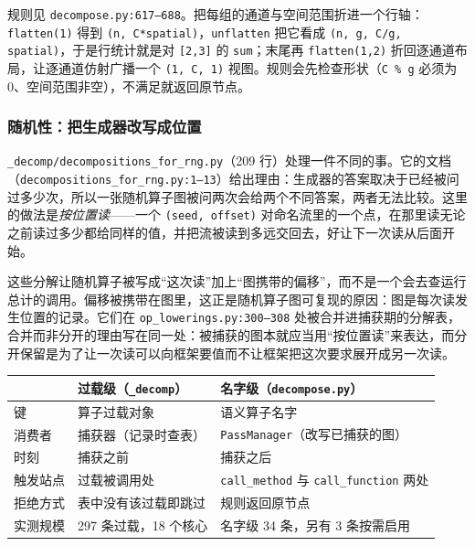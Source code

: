 \begin{tpexample}
规则见 \texttt{decompose.py:617--688}。把每组的通道与空间范围折进一个行轴：\texttt{flatten(1)} 得到 \texttt{(n, C*spatial)}，\texttt{unflatten} 把它看成 \texttt{(n, g, C/g, spatial)}，于是行统计就是对 \texttt{[2,3]} 的 \texttt{sum}；末尾再 \texttt{flatten(1,2)} 折回逐通道布局，让逐通道仿射广播一个 \texttt{(1, C, 1)} 视图。规则会先检查形状（\texttt{C \% g} 必须为 0、空间范围非空），不满足就返回原节点。
\end{tpexample}

\subsubsection{随机性：把生成器改写成位置}

\texttt{\_decomp/decompositions\_for\_rng.py}（209 行）处理一件不同的事。它的文档（\texttt{decompositions\_for\_rng.py:1--13}）给出理由：生成器的答案取决于已经被问过多少次，所以一张随机算子图被问两次会给两个不同答案，两者无法比较。这里的做法是\emph{按位置读}——一个 \texttt{(seed, offset)} 对命名流里的一个点，在那里读无论之前读过多少都给同样的值，并把流被读到多远交回去，好让下一次读从后面开始。

这些分解让随机算子被写成“这次读”加上“图携带的偏移”，而不是一个会去查运行总计的调用。偏移被携带在图里，这正是随机算子图可复现的原因：图是每次读发生位置的记录。它们在 \texttt{op\_lowerings.py:300--308} 处被合并进捕获期的分解表，合并而非分开的理由写在同一处：被捕获的图本就应当用“按位置读”来表达，而分开保留是为了让一次读可以向框架要值而不让框架把这次要求展开成另一次读。

\begin{tpdef}[两套分解表的分工]
\begin{tabular}{lll}
\toprule
 & 过载级（\texttt{\_decomp}） & 名字级（\texttt{decompose.py}） \\
\midrule
键 & 算子过载对象 & 语义算子名字 \\
消费者 & 捕获器（记录时查表） & \texttt{PassManager}（改写已捕获的图） \\
时刻 & 捕获之前 & 捕获之后 \\
触发站点 & 过载被调用处 & \texttt{call\_method} 与 \texttt{call\_function} 两处 \\
拒绝方式 & 表中没有该过载即跳过 & 规则返回原节点 \\
实测规模 & 297 条过载，18 个核心 & 名字级 34 条，另有 3 条按需启用 \\
\bottomrule
\end{tabular}
\end{tpdef}

